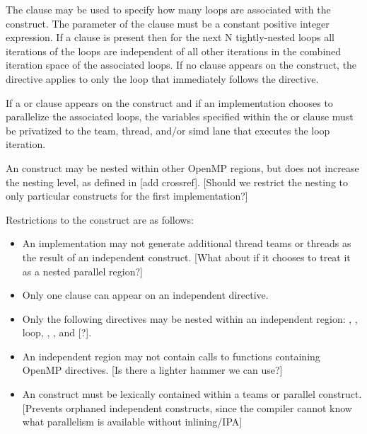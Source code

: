 The  clause may be used to specify how many loops are associated with the
 construct. The parameter of the  clause must be
a constant positive integer expression. If a  clause is present then for the next N
tightly-nested loops all iterations of the loops are independent of all other
iterations in the combined iteration space of the associated loops. If no
 clause appears on the construct, the  directive
applies to only the loop that immediately follows the directive.

If a  or  clause appears on the
 construct and if
an implementation chooses to parallelize the associated loops, the variables
specified within the  or  clause must be privatized to the team, thread,
and/or simd lane that executes the loop iteration.

An  construct may be nested within other OpenMP regions, but does
not increase the nesting level, as defined in [add crossref]. [Should we
restrict the nesting to only particular constructs for the first
implementation?]

\restrictions
Restrictions to the  construct are as follows:

\begin{itemize}
    
  \item An implementation may not generate additional thread teams or threads
    as the result of an independent construct. [What about if it chooses to
    treat it as a nested parallel region?]

  \item Only one  clause can appear on an independent directive.
  
  \item Only the following directives may be nested within an independent
    region: , , loop, , 
    , and [?]. %

  \item An independent region may not contain calls to functions containing
    OpenMP directives. [Is there a lighter hammer we can use?] %
    
  \item An  construct must be lexically contained within a teams or
    parallel construct. [Prevents orphaned independent constructs, since the
    compiler cannot know what parallelism is available without inlining/IPA]

\end{itemize}

